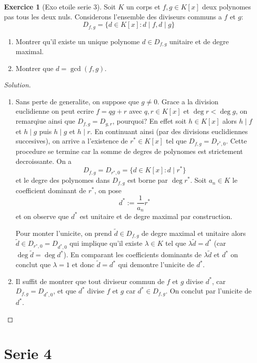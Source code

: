 \documentclass[a4paper,11pt,french]{report}
\theoremstyle{plain}
\theoremstyle{definition}
\newtheorem{exercise}{Exercice}[chapter]
\begin{document}
\begin{exercise}[Exo etoile serie 3]
Soit $K$ un corps et $f,g\in K[x]$ deux polynomes pas tous les deux nuls. Considerons l'ensemble des diviseurs communs a $f$ et $g$:
$$
D_{f,g}=\{ d\in K[x]:d\mid f , d\mid g\}
$$
\begin{enumerate}
\item Montrer qu'il existe un unique polynome $d\in D_{f,g}$ unitaire et de degre maximal.
\item Montrer que $d=\gcd(f,g)$.
\end{enumerate}
\end{exercise}
\begin{proof}[Solution]
\begin{enumerate}
\item Sans perte de generalite, on suppose que $g\neq 0$. Grace a la division euclidienne on peut ecrire $f=qg+r$ avec $q,r\in K[x]$ et $\deg r< \deg g$, on remarqiue ainsi que $D_{f,g}=D_{g,r}$, pourquoi? En effet soit $h\in K[x]$ alors $h \mid f$ et $h \mid g$ puis $h \mid g$ et $h \mid r$. En continuant ainsi (par des divisions euclidiennes succesives), on arrive a l'existence de $r^{*}\in K[x]$ tel que $D_{f,g}=D_{r^{*},0}$. Cette procedure se termine car la somme de degres de polynomes est strictement decroissante. On a
$$
D_{f,g}=D_{r^{*},0}=\{ d\in K[x]:d\mid r^{*} \}
$$
et le degre des polynomes dans $D_{f,g}$ est borne par $\deg r^{*}$. Soit $a_{n}\in K$ le coefficient dominant de $r^{*}$, on pose
$$
d^{*}:= \frac{1}{a_{n}}r^{*}
$$
et on observe que $d^{*}$ est unitaire et de degre maximal par construction.

Pour monter l'unicite, on prend $\tilde{d}\in D_{f,g}$ de degre maximal et unitaire alors $\tilde{d}\in D_{r^{*},0}=D_{d^{*},0}$ qui implique qu'il existe $\lambda \in K$ tel que $\lambda \tilde{d}=d^{*}$ (car $\deg \tilde{d} = \deg d^{*}$). En comparant les coefficients dominants de $\lambda \tilde{d}$ et $d^{*}$ on conclut que $\lambda=1$ et donc $\tilde{d}=d^{*}$ qui demontre l'unicite de $d^{*}$.
\item Il suffit de montrer que tout diviseur commun de $f$ et $g$ divise $d^{*}$, car $D_{f,g}=D_{d^{*},0}$, et que $d^{*}$ divise $f$ et $g$ car $d^{*}\in D_{f,g}$. On conclut par l'unicite de $d^{*}$.
\end{enumerate}
\end{proof}

\chapter{Serie 4}
\end{document}
